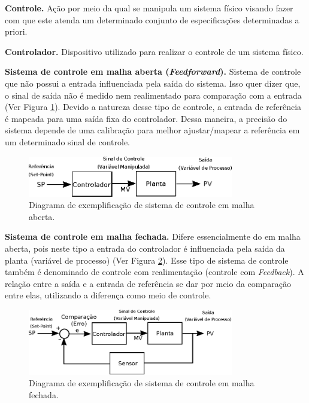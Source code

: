 \textbf{Controle.} Ação por meio da qual se manipula um sistema físico visando fazer com que este atenda um determinado conjunto de especificações determinadas a priori.

\textbf{Controlador.} Dispositivo utilizado para realizar o controle de um sistema físico.



\textbf{Sistema de controle em malha aberta (\emph{Feedforward}).} Sistema de controle que não possui a entrada influenciada pela saída do sistema. Isso quer dizer que, o sinal de saída não é medido nem realimentado para comparação com a entrada (Ver Figura \ref{fig:ilustracao_sistema_malha_aberta}). Devido a natureza desse tipo de controle, a entrada de referência é mapeada para uma saída fixa do controlador. Dessa maneira, a precisão do sistema depende de uma calibração para melhor ajustar/mapear a referência em um determinado sinal de controle.

\begin{figure}[H]
    \centering
    \includegraphics[width=0.8\textwidth]{figuras/ilustracoes/diagrama_sistema_malha_aberta.eps}
    \caption{Diagrama de exemplificação de sistema de controle em malha aberta.}
    \label{fig:ilustracao_sistema_malha_aberta}
\end{figure}

\textbf{Sistema de controle em malha fechada.} Difere essencialmente do em malha aberta, pois neste tipo a entrada do controlador é influenciada pela saída da planta (variável de processo) (Ver Figura \ref{fig:ilustracao_sistema_malha_fechada}). Esse tipo de sistema de controle também é denominado de controle com realimentação (controle com \emph{Feedback}). A relação entre a saída e a entrada de referência se dar por meio da comparação entre elas, utilizando a diferença como meio de controle.

\begin{figure}[H]
    \centering
    \includegraphics[width=0.8\textwidth]{figuras/ilustracoes/diagrama_sistema_malha_fechada.eps}
    \caption{Diagrama de exemplificação de sistema de controle em malha fechada.}
    \label{fig:ilustracao_sistema_malha_fechada}
\end{figure}



